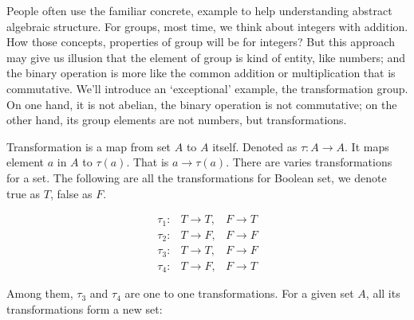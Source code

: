 \documentclass[b5paper]{article}
\begin{document}


People often use the familiar concrete, example to help understanding abstract algebraic structure. For groups, most time, we think about integers with addition. How those concepts, properties of group will be for integers? But this approach may give us illusion that the element of group is kind of entity, like numbers; and the binary operation is more like the common addition or multiplication that is commutative. We'll introduce an `exceptional' example, the transformation group. On one hand, it is not abelian, the binary operation is not commutative; on the other hand, its group elements are not numbers, but transformations.

Transformation is a map from set $A$ to $A$ itself. Denoted as $\tau : A \to A$. It maps element $a$ in $A$ to $\tau(a)$. That is $a \to \tau(a)$. There are varies transformations for a set. The following are all the transformations for Boolean set, we denote true as $T$, false as $F$.

\[
\begin{array}{rll}
\tau_1 : & T \to T, & F \to T \\
\tau_2 : & T \to F, & F \to F \\
\tau_3 : & T \to T, & F \to F \\
\tau_4 : & T \to F, & F \to T
\end{array}
\]

Among them, $\tau_3$ and $\tau_4$ are one to one transformations. For a given set $A$, all its transformations form a new set:
\end{document}
